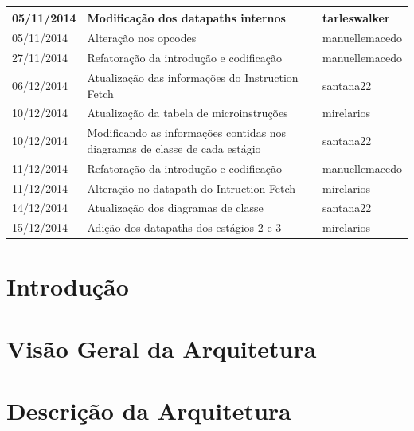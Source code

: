 \documentclass{report}
\begin{document}
\begin{longtable}[pos]{|m{2cm} | m{7.2cm} | m{3.8cm}|}
      \small 05/11/2014 & \small Modificação dos datapaths internos & \small tarleswalker \\ \hline
      \small 05/11/2014 & \small Alteração nos opcodes & \small manuellemacedo \\ \hline
      \small 27/11/2014 & \small Refatoração da introdução e codificação & \small manuellemacedo \\ \hline
      \small 06/12/2014 & \small Atualização das informações do Instruction Fetch & \small santana22 \\ \hline
      \small 10/12/2014 & \small Atualização da tabela de microinstruções  & \small mirelarios \\ \hline
      \small 10/12/2014 & \small Modificando as informações contidas nos diagramas de classe de cada estágio  & \small  santana22 \\ \hline
      \small 11/12/2014 & \small Refatoração da introdução e codificação & \small manuellemacedo \\ \hline
      \small 11/12/2014 & \small Alteração no datapath do Intruction Fetch  & \small mirelarios \\ \hline
      \small 14/12/2014 & \small Atualização dos diagramas de classe & \small santana22 \\ \hline
      \small 15/12/2014 & \small Adição dos datapaths dos estágios 2 e 3 & \small mirelarios \\ \hline
	\end{longtable}

\tableofcontents

\chapter{Introdução}
  
	

\chapter{Visão Geral da Arquitetura}

%	
	
	
	
	

\chapter{Descrição da Arquitetura}
\end{document}
